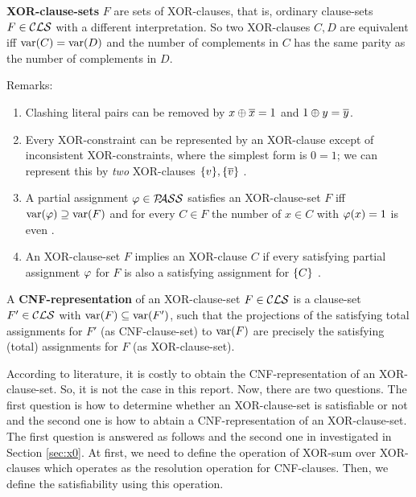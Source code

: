 \documentclass[]{book}
\begin{document}
\begin{defi}\label{def:xor-cls}
      \textbf{XOR-clause-sets} $F$ are sets of XOR-clauses, that is, ordinary clause-sets $F \in \mathcal{CLS}$ with a different interpretation. 
	  So two XOR-clauses $C, D$ are equivalent iff $\operatorname{var}(C) = \operatorname{var}(D)$ and the number of complements in $C$ has the same parity as the 
	  number of complements in $D$.
\end{defi}
Remarks:
\begin{enumerate}
      \item Clashing literal pairs can be removed by $x \oplus \overline{x} = 1$ and $1 \oplus y = \overline{y}$.
	  \item Every XOR-constraint can be represented by an XOR-clause except of inconsistent XOR-constraints, 
	  where the simplest form is $0=1$; we can represent this by \emph{two} XOR-clauses $\{ v \}, \{ \overline{v} \}$ \cite{h8}.
	  \item A partial assignment $\varphi \in \mathcal{P\hspace{-0.32em}ASS}$ satisfies an XOR-clause-set $F$ iff $\operatorname{var}(\varphi) \supseteq \operatorname{var}(F)$ and for 
	  every $C \in F$ the number of $x \in C$ with $\varphi(x) = 1$ is even \cite{h8}. 
	  \item An XOR-clause-set $F$ implies an XOR-clause $C$ if every satisfying partial assignment $\varphi$ for $F$ is also a 
	  satisfying assignment for $\{ C \}$ \cite{h8}.  
\end{enumerate}

\begin{defi}\label{def:cnfrepxor} 
  \cite{h8} A \textbf{CNF-representation} of an XOR-clause-set $F \in \mathcal{CLS}$ is a clause-set $F' \in \mathcal{CLS}$ with $\operatorname{var}(F) \subseteq \operatorname{var}(F')$, 
  such that the projections of the satisfying total assignments for $F'$ (as CNF-clause-set) to $\operatorname{var}(F)$ are precisely the satisfying 
  (total) assignments for $F$ (as XOR-clause-set).
\end{defi}
According to literature, it is costly to obtain the CNF-representation of an XOR-clause-set. So, it is not the case in this report. 
Now, there are two questions. The first question is how to determine whether an XOR-clause-set is satisfiable or not and the
second one is how to abtain a CNF-representation of an XOR-clause-set. The first question is answered as follows and the second 
one in investigated in Section \ref{sec:x0}.
At first, we need to define the operation of XOR-sum over XOR-clauses which operates as the resolution operation for CNF-clauses.
Then, we define the satisfiability using this operation.
\end{document}
